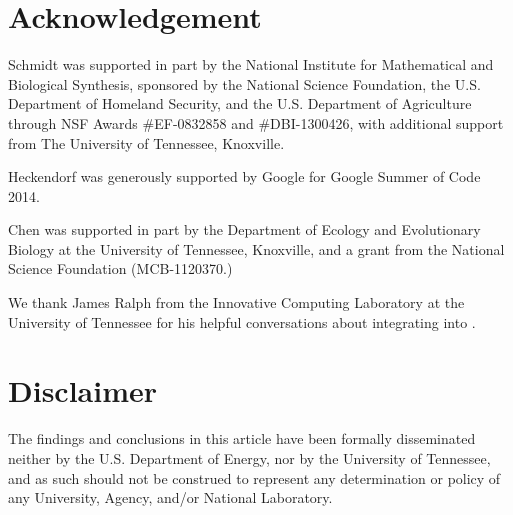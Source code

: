 \section*{Acknowledgement}

Schmidt was supported in part by the National 
Institute for Mathematical and Biological Synthesis, 
sponsored by the National Science Foundation, the 
U.S. Department of Homeland Security, and the U.S. 
Department of Agriculture through NSF Awards 
\#EF-0832858 and \#DBI-1300426, with additional 
support from The University of Tennessee, Knoxville. 

Heckendorf was generously supported by Google for Google 
Summer of Code 2014.

Chen was supported in part by
the Department of Ecology and Evolutionary Biology at the
University of Tennessee, Knoxville, and a grant from
the National Science Foundation (MCB-1120370.)

We thank James Ralph from the Innovative Computing Laboratory at the University 
of Tennessee for his helpful conversations about integrating \PAPI into \R.

\section*{Disclaimer}
The findings and conclusions in this article have been formally disseminated
neither by the U.S. Department of Energy, nor by the University of Tennessee,
and as such should not be construed to represent any determination or policy of
any University, Agency, and/or National Laboratory.
